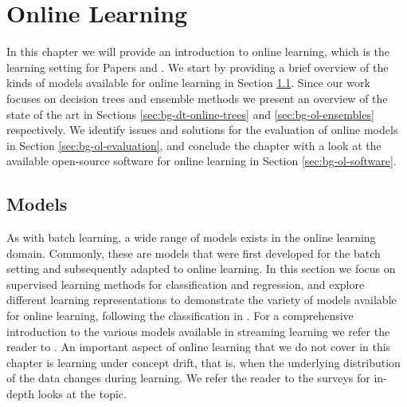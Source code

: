 \chapter{Online Learning}
\label{ch:bg-online-learning}

In this chapter we will provide an introduction to online learning, which is the learning
setting for Papers \boostvhtNum and \uncertaintreesNum. We start by providing a brief
overview of the kinds of models available for online learning in Section \ref{sec:bg-ol-models}.
Since our work focuses on decision trees and ensemble methods we present an overview of
the state of the art in Sections \ref{sec:bg-dt-online-trees} and \ref{sec:bg-ol-ensembles} respectively.
We identify issues and solutions for the evaluation of online models in Section \ref{sec:bg-ol-evaluation}, and conclude the chapter with a look at the available
open-source software for online learning in Section \ref{sec:bg-ol-software}.

\section{Models}
\label{sec:bg-ol-models}

As with batch learning, a wide range of models exists in the online
learning domain. Commonly, these are models that were first developed
for the batch setting and subsequently adapted to online learning.
In this section we focus on supervised learning methods for
classification and regression, and explore different
learning representations to demonstrate the variety of
models available for online learning, following the
classification in \cite{onlineML}. For a comprehensive
introduction to the various models available in streaming
learning we refer the reader to \cite{moa-book}.
An important aspect of online learning that we do not cover in this chapter is learning
under concept drift, that is, when the underlying distribution
of the data changes during learning. We refer the reader
to the surveys \cite{concept-drift-survey-indre, concept-drift-survey-gama}
for in-depth looks at the topic.

